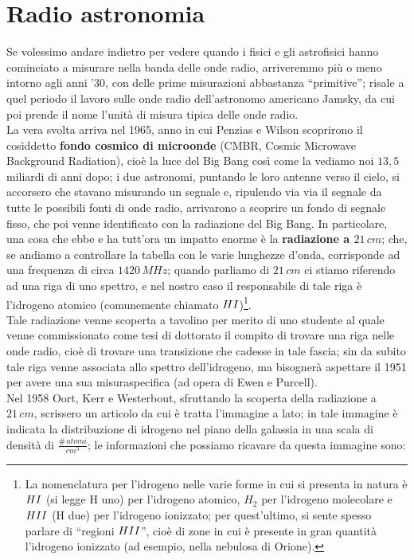\section{Radio astronomia}
Se volessimo andare indietro per vedere quando i fisici e gli astrofisici hanno cominciato a misurare nella banda delle onde radio, arriveremmo più o meno intorno agli anni '30, con delle prime misurazioni abbastanza ``primitive''; risale a quel periodo il lavoro sulle onde radio dell'astronomo americano Jamsky, da cui poi prende il nome l'unità di misura tipica delle onde radio.\\
La vera svolta arriva nel 1965, anno in cui Penzias e Wilson scoprirono il cosìddetto \textbf{fondo cosmico di microonde} (CMBR, Cosmic Microwave Background Radiation), cioè la luce del Big Bang così come la vediamo noi $13,5$ miliardi di anni dopo; i due astronomi, puntando le loro antenne verso il cielo, si accorsero che stavano misurando un segnale e, ripulendo via via il segnale da tutte le possibili fonti di onde radio, arrivarono a scoprire un fondo di segnale fisso, che poi venne identificato con la radiazione del Big Bang. In particolare, una cosa che ebbe e ha tutt'ora un impatto enorme è la \textbf{radiazione a $21 \, cm$}; che, se andiamo a controllare la tabella con le varie lunghezze d'onda, corrisponde ad una frequenza di circa $1420 \, MHz$; quando parliamo di $21 \, cm$ ci stiamo riferendo ad una riga di uno spettro, e nel nostro caso il responsabile di tale riga è l'idrogeno atomico (comunemente chiamato $H \RNum{1}$)\footnote{La nomenclatura per l'idrogeno nelle varie forme in cui si presenta in natura è $H \RNum{1}$ (si legge H uno) per l'idrogeno atomico, $H_2$ per l'idrogeno molecolare e $H \RNum{2}$ (H due) per l'idrogeno ionizzato; per quest'ultimo, si sente spesso parlare di ``regioni $H \RNum{2}$'', cioè di zone in cui è presente in gran quantità l'idrogeno ionizzato (ad esempio, nella nebulosa di Orione).}.\\
Tale radiazione venne scoperta a tavolino per merito di uno studente al quale venne commissionato come tesi di dottorato il compito di trovare una riga nelle onde radio, cioè di trovare una transizione che cadesse in tale fascia; sin da subito tale riga venne associata allo spettro dell'idrogeno, ma bisognerà aspettare il 1951 per avere una sua misuraspecifica (ad opera di Ewen e Purcell).\\
Nel 1958 Oort, Kerr e Westerbout, sfruttando la scoperta della radiazione a $21 \, cm$, scrissero un articolo da cui è tratta l'immagine a lato; in tale immagine è indicata la distribuzione di idrogeno nel piano della galassia in una scala di densità di $\frac{\# \, atomi}{cm^3}$; le informazioni che possiamo ricavare da questa immagine sono:\\
